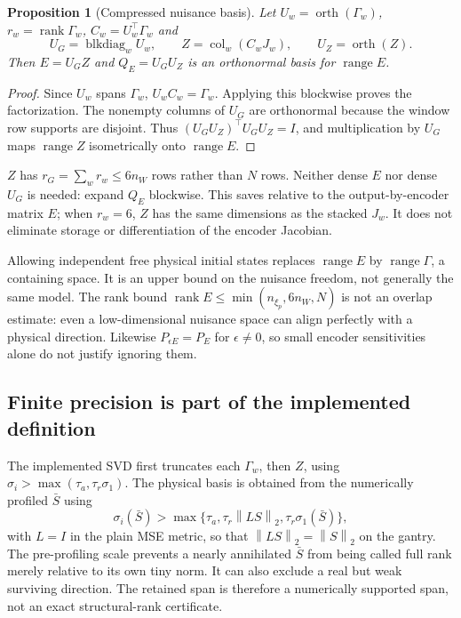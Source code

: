 \documentclass[11pt,a4paper]{article}
\newcommand{\ran}{\operatorname{range}}
\newcommand{\rank}{\operatorname{rank}}
\newcommand{\orth}{\operatorname{orth}}
\newcommand{\blkdiag}{\operatorname{blkdiag}}
\newcommand{\col}{\operatorname{col}}
\newcommand{\norm}[1]{\left\lVert#1\right\rVert}
\newtheorem{proposition}{Proposition}[section]
\theoremstyle{remark}
\begin{document}
\begin{proposition}[Compressed nuisance basis]\label{prop:compression}
Let $U_w=\orth(\Gamma_w)$, $r_w=\rank\Gamma_w$, $C_w=U_w^\top\Gamma_w$ and
\begin{equation}\label{eq:compression}
 U_G=\blkdiag_w U_w,\qquad Z=\col_w(C_wJ_w),\qquad U_Z=\orth(Z).
\end{equation}
Then $E=U_G Z$ and $Q_E=U_GU_Z$ is an orthonormal basis for $\ran E$.
\end{proposition}
\begin{proof}
Since $U_w$ spans $\Gamma_w$, $U_w C_w=\Gamma_w$. Applying this blockwise proves the factorization. The nonempty columns of $U_G$ are orthonormal because the window row supports are disjoint. Thus $(U_GU_Z)^\top U_GU_Z=I$, and multiplication by $U_G$ maps $\ran Z$ isometrically onto $\ran E$.
\end{proof}
$Z$ has $r_G=\sum_w r_w\le6n_W$ rows rather than $N$ rows. Neither dense $E$ nor dense $U_G$ is needed: expand $Q_E$ blockwise. This saves relative to the output-by-encoder matrix $E$; when $r_w=6$, $Z$ has the same dimensions as the stacked $J_w$. It does not eliminate storage or differentiation of the encoder Jacobian.

Allowing independent free physical initial states replaces $\ran E$ by $\ran\Gamma$, a containing space. It is an upper bound on the nuisance freedom, not generally the same model. The rank bound $\rank E\le\min(n_{\xi_p},6n_W,N)$ is not an overlap estimate: even a low-dimensional nuisance space can align perfectly with a physical direction. Likewise $P_{\epsilon E}=P_E$ for $\epsilon\ne0$, so small encoder sensitivities alone do not justify ignoring them.

\subsection{Finite precision is part of the implemented definition}\label{sec:rank}
The implemented SVD first truncates each $\Gamma_w$, then $Z$, using $\sigma_i>\max(\tau_a,\tau_r\sigma_1)$. The physical basis is obtained from the numerically profiled $\bar S$ using
\begin{equation}\label{eq:threshold}
 \sigma_i(\bar S)>\max\{\tau_a,\tau_r\norm{LS}_2,\tau_r\sigma_1(\bar S)\},
\end{equation}
with $L=I$ in the plain MSE metric, so that $\norm{LS}_2=\norm S_2$ on the gantry. The pre-profiling scale prevents a nearly annihilated $\bar S$ from being called full rank merely relative to its own tiny norm. It can also exclude a real but weak surviving direction. The retained span is therefore a numerically supported span, not an exact structural-rank certificate.
\end{document}

